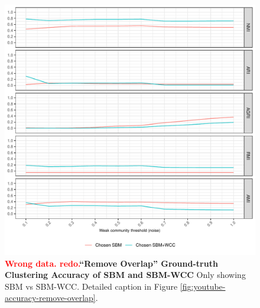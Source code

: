 \documentclass[aps,pre,superscriptaddress]{revtex4}
\begin{document}
\begin{figure}[!htpb]
\centering
\includegraphics[]{figures/remove_overlap_youtube_sbm_accuracy.pdf}
\caption[]{\textbf{\textcolor{red}{Wrong data. redo.}``Remove Overlap'' Ground-truth Clustering Accuracy of SBM and SBM-WCC} Only showing SBM vs SBM-WCC. Detailed caption in Figure \ref{fig:youtube-accuracy-remove-overlap}.}
\label{fig:remove-overlap-sbm}
\end{figure}
\end{document}
